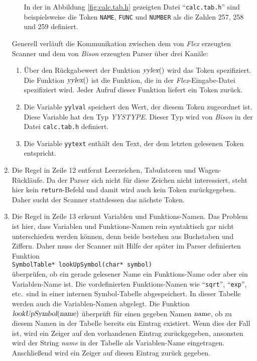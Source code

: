 \begin{enumerate}
\begin{enumerate}
            In der in Abbildung \ref{fig:calc.tab.h} gezeigten Datei
            ``\texttt{calc.tab.h}'' sind beispielsweise  
            die Token \texttt{NAME}, \texttt{FUNC} und \texttt{NUMBER} als die
            Zahlen 257, 258 und 259 definiert.
      \end{enumerate}
      Generell verl\"auft die Kommunikation zwischen dem von \textsl{Flex} erzeugten Scanner
      und dem von \textsl{Bison} erzeugten Parser \"uber drei Kan\"ale:
      \begin{enumerate}
      \item \"Uber den R\"uckgabewert der Funktion $\textsl{yylex}()$ wird das Token
            spezifiziert.  Die Funktion $\textsl{yylex}()$ ist die Funktion, die in der
            \textsl{Flex}-Eingabe-Datei spezifiziert wird.  Jeder Aufruf dieser Funktion
            liefert ein Token zur\"uck.
      \item Die Variable \texttt{yylval} speichert den Wert, der diesem Token zugeordnet
            ist.  Diese Variable hat den Typ \textsl{YYSTYPE}.  Dieser Typ wird von 
            \textsl{Bison} in der Datei \texttt{calc.tab.h} definiert.
      \item Die Variable \texttt{yytext} enth\"alt den Text, der dem letzten gelesenen Token
            entspricht.
      \end{enumerate}
\item Die Regel in Zeile 12 entfernt Leerzeichen, Tabulatoren und Wagen-R\"uckl\"aufe.
      Da der Parser sich nicht f\"ur diese Zeichen nicht interessiert, steht hier
      kein \texttt{return}-Befehl und damit wird auch kein Token zur\"uckgegeben.
      Daher sucht der  Scanner stattdessen das n\"achste Token.
\item Die Regel in Zeile 13 erkennt Variablen und Funktions-Namen.  Das Problem
      ist hier, dass  Variablen und Funktions-Namen rein syntaktisch gar nicht
      unterschieden werden k\"onnen, denn beide bestehen aus Buchstaben und
      Ziffern. Daher muss der Scanner mit Hilfe der sp\"ater im Parser
      definierten Funktion
      \\[0.2cm]
      \hspace*{1.3cm} \texttt{SymbolTable* lookUpSymbol(char* symbol)}
      \\[0.2cm]
      \"uberpr\"ufen, ob ein gerade gelesener Name ein Funktions-Name oder aber ein
      Variablen-Name ist.  Die vordefinierten Funktions-Namen wie ``\texttt{sqrt}'',
      ``\texttt{exp}'', etc.~sind in einer internen Symbol-Tabelle abgespeichert.  In
      dieser Tabelle werden auch die Variablen-Namen abgelegt.  Die Funktion
      $\textsl{lookUpSymbol}(\textsl{name})$ \"uberpr\"uft f\"ur einen gegeben Namen
      $\textsl{name}$, ob zu diesem 
      Namen in der Tabelle bereits ein Eintrag existiert.  Wenn dies der Fall ist,
      wird ein Zeiger auf den vorhandenen Eintrag zur\"uckgegeben, ansonsten wird der 
      String \textsl{name} in der Tabelle als Variablen-Name eingetragen.  Anschlie{\ss}end
      wird ein Zeiger auf diesen Eintrag zur\"uck gegeben.
      

\end{enumerate}
